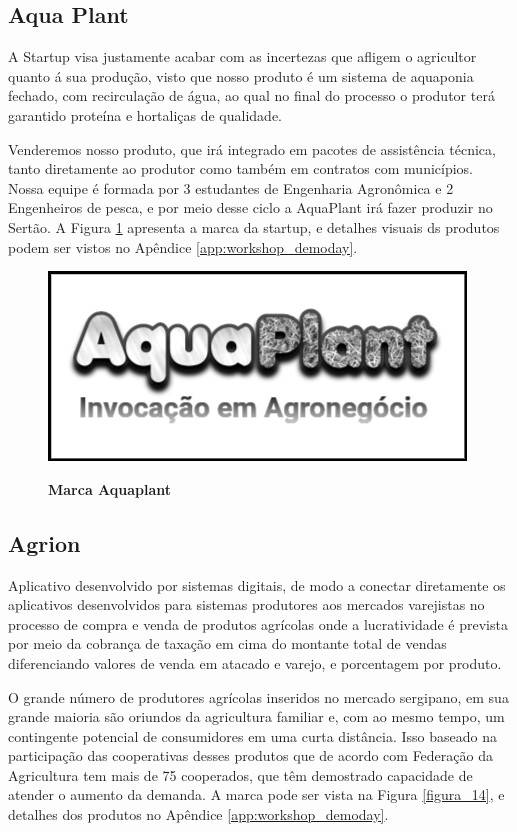 \subsection{Aqua Plant}

A Startup visa justamente acabar com as incertezas que afligem o agricultor quanto á sua produção, visto que nosso produto é um sistema de aquaponia fechado, com recirculação de água, ao qual no final do processo o produtor terá garantido proteína e hortaliças de qualidade.

Venderemos nosso produto, que irá integrado em pacotes de assistência técnica, tanto diretamente ao produtor como também em contratos com municípios. Nossa equipe é formada por 3 estudantes de Engenharia Agronômica e 2 Engenheiros de pesca, e por meio desse ciclo a AquaPlant irá fazer produzir no Sertão. A Figura \ref{figura_13} apresenta a marca da startup, e detalhes visuais  ds produtos podem ser vistos no Apêndice \ref{app:workshop_demoday}.


\begin{figure}[H]
\centering
\caption{\textbf{Marca Aquaplant}}
\includegraphics[scale=0.5]{Imagens/aquaplant.png}
\label{figura_13}
\end{figure}


\subsection{Agrion}

Aplicativo desenvolvido por sistemas digitais, de modo a conectar diretamente os aplicativos desenvolvidos para sistemas produtores aos mercados varejistas no processo de compra e venda de produtos agrícolas onde a lucratividade é prevista por meio da cobrança de taxação em cima do montante total de vendas diferenciando valores de venda em atacado e varejo, e porcentagem por produto.


O grande número de produtores agrícolas inseridos no mercado sergipano, em sua grande maioria são oriundos da agricultura familiar e, com ao mesmo tempo, um contingente potencial de consumidores em uma curta distância. Isso baseado na participação das cooperativas desses produtos que de acordo com Federação da Agricultura tem mais de 75 cooperados, que têm demostrado capacidade de atender o aumento da demanda. A marca pode ser vista na Figura \ref{figura_14}, e detalhes dos produtos no Apêndice \ref{app:workshop_demoday}.


